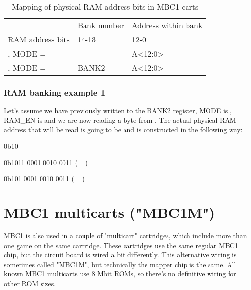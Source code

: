 \begin{table}[H]
  \caption{Mapping of physical RAM address bits in MBC1 carts}
  \ttfamily
  \begin{tabu} to \textwidth {|X[10,l]|X[5,c]|X[13,c]|}
    \everyrow{\hline}
    \hline
    \rowfont{\rmfamily}
    & Bank number & Address within bank \\
    \rowfont{\rmfamily}
    RAM address bits                      & 14-13    & 12-0    \\
    , MODE =  &  & A<12:0> \\
    , MODE =  & BANK2    & A<12:0>
  \end{tabu}
\end{table}

\subsubsection{RAM banking example 1}

Let's assume we have previously written  to the BANK2 register, MODE is
, RAM\_EN is  and we are now reading a byte from .
The actual physical RAM address that will be read is going to be  and
is constructed in the following way:

\begin{description}[leftmargin=15em,style=nextline]
  \item[Value of the BANK2 register]
  {
    \ttfamily
    0b\colorbox{red!30}{10}
  }
  \item[Address being read]
  {
    \ttfamily
    0b\colorbox{gray!10}{101}\colorbox{green!30}{1 0001 0010 0011} (= )
  }
  \item[Actual physical RAM address]
  {
    \ttfamily
    0b\colorbox{red!30}{10}\colorbox{green!30}{1 0001 0010 0011} (= )
  }
\end{description}

\section{MBC1 multicarts ("MBC1M")}

MBC1 is also used in a couple of "multicart" cartridges, which include more
than one game on the same cartridge. These cartridges use the same regular MBC1
chip, but the circuit board is wired a bit differently. This alternative wiring
is sometimes called "MBC1M", but technically the mapper chip is the same. All
known MBC1 multicarts use 8 Mbit ROMs, so there's no definitive wiring for
other ROM sizes.

